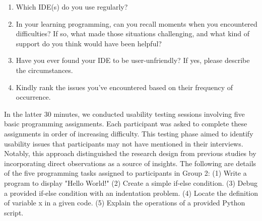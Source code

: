 \begin{enumerate}

\item Which IDE(s) do you use regularly?
  
\item In your learning programming, can you recall moments when you encountered difficulties? If so, what made those situations challenging, and what kind of support do you think would have been helpful?

\item Have you ever found your IDE to be user-unfriendly? If yes, please describe the circumstances.

\item Kindly rank the issues you've encountered based on their frequency of occurrence.

\end{enumerate}

In the latter 30 minutes, we conducted usability testing sessions
involving five basic programming assignments. Each participant was
asked to complete these assignments in order of increasing
difficulty. This testing phase aimed to identify usability issues that
participants may not have mentioned in their interviews. Notably, this
approach distinguished the research design from previous studies by
incorporating direct observations as a source of insights. The
following are details of the five programming tasks assigned to
participants in Group 2: (1) Write a program to display "Hello World!"
(2) Create a simple if-else condition.  (3) Debug a provided if-else
condition with an indentation problem.  (4) Locate the definition of
variable x in a given code.  (5) Explain the operations of a provided
Python script.

